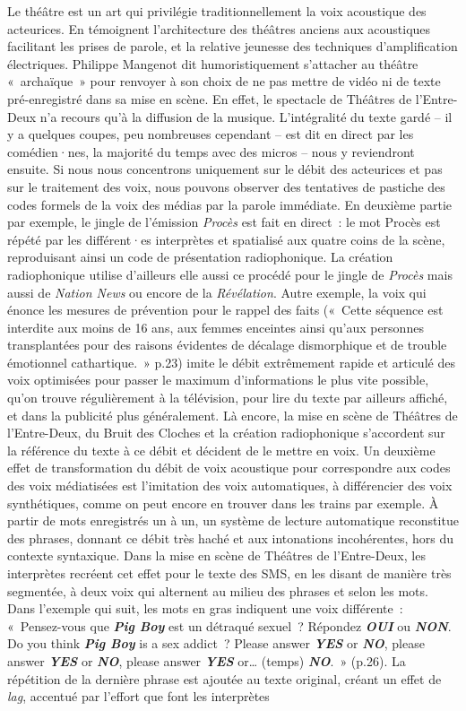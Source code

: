 \documentclass[
]{article}
\begin{document}
Le théâtre est un art qui privilégie traditionnellement la voix acoustique des acteurices. En témoignent l'architecture des théâtres anciens aux acoustiques facilitant les prises de parole, et la relative jeunesse des techniques d'amplification électriques. Philippe Mangenot dit humoristiquement s'attacher au théâtre «~archaïque~» pour renvoyer à son choix de ne pas mettre de vidéo ni de texte pré-enregistré dans sa mise en scène. En effet, le spectacle de Théâtres de l'Entre-Deux n'a recours qu'à la diffusion de la musique. L'intégralité du texte gardé -- il y a quelques coupes, peu nombreuses cependant -- est dit en direct par les comédien·nes, la majorité du temps avec des micros -- nous y reviendront ensuite. Si nous nous concentrons uniquement sur le débit des acteurices et pas sur le traitement des voix, nous pouvons observer des tentatives de pastiche des codes formels de la voix des médias par la parole immédiate. En deuxième partie par exemple, le jingle de l'émission \emph{Procès} est fait en direct~: le mot Procès est répété par les différent·es interprètes et spatialisé aux quatre coins de la scène, reproduisant ainsi un code de présentation radiophonique. La création radiophonique utilise d'ailleurs elle aussi ce procédé pour le jingle de \emph{Procès} mais aussi de \emph{Nation News} ou encore de la \emph{Révélation}. Autre exemple, la voix qui énonce les mesures de prévention pour le rappel des faits («~Cette séquence est interdite aux moins de 16 ans, aux femmes enceintes ainsi qu'aux personnes transplantées pour des raisons évidentes de décalage dismorphique et de trouble émotionnel cathartique.~» p.23) imite le débit extrêmement rapide et articulé des voix optimisées pour passer le maximum d'informations le plus vite possible, qu'on trouve régulièrement à la télévision, pour lire du texte par ailleurs affiché, et dans la publicité plus généralement. Là encore, la mise en scène de Théâtres de l'Entre-Deux, du Bruit des Cloches et la création radiophonique s'accordent sur la référence du texte à ce débit et décident de le mettre en voix. Un deuxième effet de transformation du débit de voix acoustique pour correspondre aux codes des voix médiatisées est l'imitation des voix automatiques, à différencier des voix synthétiques, comme on peut encore en trouver dans les trains par exemple. À partir de mots enregistrés un à un, un système de lecture automatique reconstitue des phrases, donnant ce débit très haché et aux intonations incohérentes, hors du contexte syntaxique. Dans la mise en scène de Théâtres de l'Entre-Deux, les interprètes recréent cet effet pour le texte des SMS, en les disant de manière très segmentée, à deux voix qui alternent au milieu des phrases et selon les mots. Dans l'exemple qui suit, les mots en gras indiquent une voix différente~: «~Pensez-vous que \emph{\textbf{Pig Boy} }est un détraqué sexuel~? Répondez \textbf{\emph{OUI}} ou \textbf{\emph{NON}}. Do you think \textbf{\emph{Pig Boy}} is a sex addict~? Please answer \textbf{\emph{YES}} or \textbf{\emph{NO}}, please answer \textbf{\emph{YES}} or \textbf{\emph{NO}}, please answer \textbf{\emph{YES}} or\ldots{} (temps) \textbf{\emph{NO}}.~» (p.26). La répétition de la dernière phrase est ajoutée au texte original, créant un effet de \emph{lag}, accentué par l'effort que font les interprètes 
\end{document}
